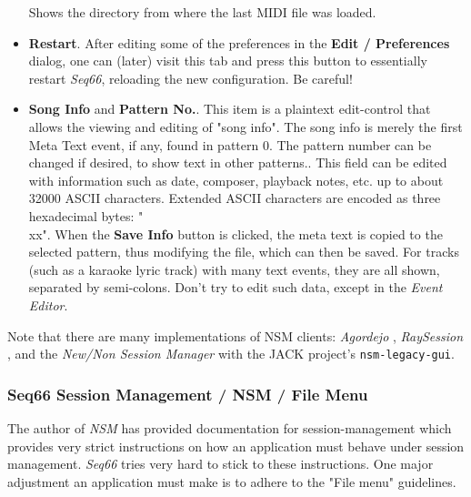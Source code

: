\begin{itemize}
         Shows the directory from where the last MIDI file was loaded.
      \item \textbf{Restart}.
         After editing some of the preferences in the \textbf{Edit / Preferences}
         dialog, one can (later)
         visit this tab and press this button to essentially
         restart \textsl{Seq66}, reloading the new configuration.
         Be careful!
      \item \textbf{Song Info} and \textbf{Pattern No.}.
         This item is a plaintext edit-control that allows the viewing and
         editing of "song info".
         The song info is merely the first Meta Text event, if any,
         found in pattern 0.
         The pattern number can be changed if desired, to show text in other
         patterns..
         This field can be edited with information such as date, composer,
         playback notes, etc. up to about 32000 ASCII characters.
         Extended ASCII characters are encoded as three hexadecimal
         bytes: "\\xx".
         When the \textbf{Save Info} button is clicked, the meta text
         is copied to the selected pattern, thus modifying the file, which
         can then be saved.
         For tracks (such as a karaoke lyric track) with many text events,
         they are all shown, separated by semi-colons.
         Don't try to edit such data, except in the \textsl{Event Editor}.
   \end{itemize}

   Note that there are many implementations of NSM clients:
   \textsl{Agordejo} \cite{agordejo},
   \textsl{RaySession} \cite{raysession},
   and the
   \textsl{New/Non Session Manager} \cite{nsm}
   with the JACK project's \texttt{nsm-legacy-gui}.

\subsubsection{Seq66 Session Management / NSM / File Menu}
\label{subsubsec:sessions_file_menu}

   The author of \textsl{NSM} has provided documentation for session-management
   which provides very strict instructions on how an application must behave
   under session management.  \textsl{Seq66} tries very hard to stick to these
   instructions.  One major adjustment an application must make is to adhere to
   the "File menu" guidelines.

